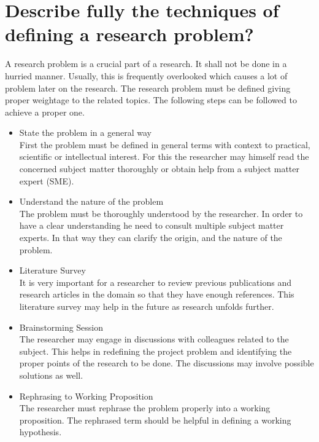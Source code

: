\documentclass[12pt,a4paper,oneside]{article}
\begin{document}

\newpage
\tableofcontents

\newpage
{}
\setcounter{page}{1}

\section{Describe fully the techniques of defining a research problem?}

A research problem is a crucial part of a research. It shall not be done in a hurried manner. Usually, this is frequently overlooked which causes a lot of problem later on the research. The research problem must be defined giving proper weightage to the related topics. The following steps can be followed to achieve a proper one.

\begin{itemize}
    \item State the problem in a general way \\
        First the problem must be defined in general terms with context to practical, scientific or intellectual interest. For this the researcher may himself read the concerned subject matter thoroughly or obtain help from a subject matter expert (SME). 
    \item Understand the nature of the problem\\
        The problem must be thoroughly understood by the researcher. In order to have a clear understanding he need to consult multiple subject matter experts. In that way they can clarify the origin, and the nature of the problem. 
    \item Literature Survey\\
        It is very important for a researcher to review previous publications and research articles in the domain so that they have enough references. This literature survey may help in the future as research unfolds further.
    \item Brainstorming Session\\
        The researcher may engage in discussions with colleagues related to the subject. This helps in redefining the project problem and identifying the proper points of the research to be done. The discussions may involve possible solutions as well. 
    \item Rephrasing to Working Proposition\\ 
        The researcher must rephrase the problem properly into a working proposition. The rephrased term should be helpful in defining a working hypothesis. 

\end{itemize}
\end{document}
